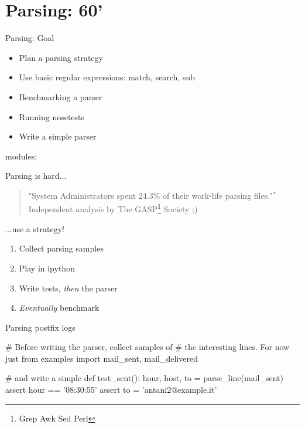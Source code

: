 \section{Parsing: 60'}

\begin{pyframe}{Parsing: Goal}
\begin{itemize}
\item Plan a parsing strategy
\item Use basic regular expressions: match, search, sub
\item Benchmarking a parser
\item Running nosetests
\item Write a simple parser
\end{itemize}
modules: 
\end{pyframe}


\begin{pyframe}{Parsing is hard...}
\begin{verse}
"System Administrators spent $24.3\%$ of
 their work-life parsing files."$^{*}$\\
\hfill *Independent analysis by The GASP\footnote{Grep Awk Sed Perl} Society ;)
\end{verse}
\end{pyframe}


\begin{pyframe}{...use a strategy!}
\begin{enumerate}
\Large
\item Collect parsing samples
\item Play in ipython
\item Write tests, \emph{then} the parser
\item \emph{Eventually} benchmark
\end{enumerate}
\end{pyframe}



\begin{pyframe}{Parsing postfix logs}
\begin{pycode}
# Before writing the parser, collect samples of
#  the interesting lines. For now just 
from examples import mail_sent, mail_delivered

# and write a simple 
def test_sent():
    hour, host, to = parse_line(mail_sent)
    assert hour == '08:30:55'
    assert to = 'antani2@example.it'

\end{pycode}
\end{pyframe}


